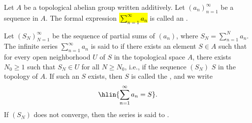 \begin{definition} \label{definition:infinite_series_and_convergence_in_a_topological_abelian_group}
    Let $A$ be a topological abelian group written additively. Let $(a_n)_{n=1}^\infty$ be a sequence in $A$. The formal expression
    \hl{$\sum_{n=1}^\infty a_n$}
    is called an .

    Let $(S_N)_{N=1}^\infty$ be the sequence of partial sums of $(a_n)$, where $S_N = \sum_{n=1}^N a_n$. The infinite series $\sum_{n=1}^\infty a_n$ is said to  if there exists an element $S \in A$ such that for every open neighborhood $U$ of $S$ in the topological space $A$, there exists $N_0 \geq 1$ such that $S_N \in U$ for all $N \geq N_0$, i.e., if the sequence $(S_N)$  $S$ in the topology of $A$. If such an $S$ exists, then $S$ is called the , and we write
    $$\hlin{\sum_{n=1}^\infty a_n = S}.$$
    If $(S_N)$ does not converge, then the series is said to .
\end{definition}
